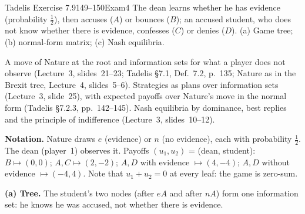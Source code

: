 \begin{exsol}{Tadelis Exercise 7.9}{149--150}{Exam}{4}
\asked The dean learns whether he has evidence (probability $\frac12$), then accuses ($A$) or
bounces ($B$); an accused student, who does not know whether there is evidence, confesses ($C$)
or denies ($D$). (a) Game tree; (b) normal-form matrix; (c) Nash equilibria.

\method A move of Nature at the root and information sets for what a player does not observe
(Lecture~3, slides~21--23; Tadelis \S7.1, Def.~7.2, p.~135; Nature as in the Brexit tree, Lecture~4,
slides~5--6). Strategies as plans over information sets (Lecture~3, slide~25), with expected
payoffs over Nature's move in the normal form (Tadelis \S7.2.3, pp.~142--145). Nash equilibria by
dominance, best replies and the principle of indifference (Lecture~3, slides~10--12).

\solution
\textbf{Notation.} Nature draws $e$ (evidence) or $n$ (no evidence), each with probability
$\frac12$. The dean (player~1) observes it. Payoffs $(u_1, u_2)$ = (dean, student):
$B \mapsto (0,0)$; $A,C \mapsto (2,-2)$; $A,D$ with evidence $\mapsto (4,-4)$; $A,D$ without
evidence $\mapsto (-4,4)$. Note that $u_1 + u_2 = 0$ at every leaf: the game is zero-sum.

\textbf{(a) Tree.} The student's two nodes (after $eA$ and after $nA$) form one information set: he
knows he was accused, not whether there is evidence.
\begin{center}
\end{center}


\end{exsol}
